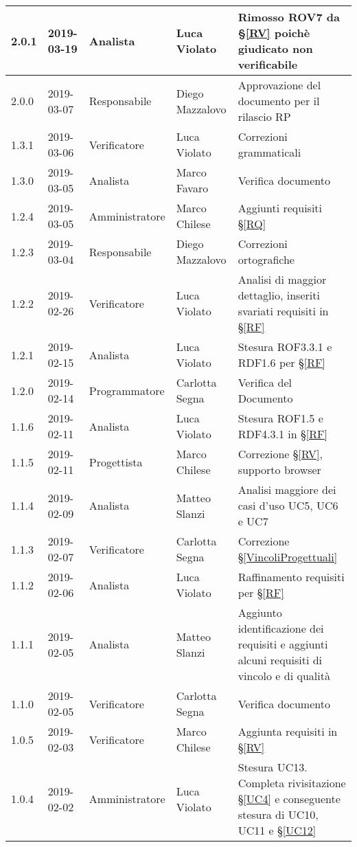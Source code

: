 \begin{center}
\begin{longtable}[C]{|m{}|m{}|m{}|m{}|p{}|}
\hline
\rowcolor{grigio}2.0.1 & 2019-03-19 & Analista & Luca Violato & Rimosso ROV7 da §\ref{RV} poichè giudicato non verificabile\\
\hline
2.0.0 & 2019-03-07 & Responsabile & Diego Mazzalovo & Approvazione del documento per il rilascio RP\\
\hline
\rowcolor{grigio}1.3.1 & 2019-03-06 & Verificatore & Luca Violato & Correzioni grammaticali\\
\hline
1.3.0 & 2019-03-05 & Analista & Marco Favaro & Verifica documento\\
\hline
\rowcolor{grigio}1.2.4 & 2019-03-05 & Amministratore & Marco Chilese & Aggiunti requisiti §\ref{RQ}\\
\hline
1.2.3 & 2019-03-04 & Responsabile & Diego Mazzalovo & Correzioni ortografiche\\
\hline
\rowcolor{grigio}1.2.2 & 2019-02-26 & Verificatore & Luca Violato & Analisi di maggior dettaglio, inseriti svariati requisiti in §\ref{RF}\\
\hline
1.2.1 & 2019-02-15 & Analista & Luca Violato & Stesura ROF3.3.1 e RDF1.6 per §\ref{RF}\\
\hline
\rowcolor{grigio} 1.2.0 & 2019-02-14 & Programmatore & Carlotta Segna & Verifica del Documento\\
\hline
1.1.6 & 2019-02-11 & Analista & Luca Violato & Stesura ROF1.5 e RDF4.3.1 in §\ref{RF}\\
\hline
\rowcolor{grigio}1.1.5 & 2019-02-11 & Progettista & Marco Chilese & Correzione §\ref{RV}, supporto browser\\
\hline
1.1.4 & 2019-02-09 & Analista & Matteo Slanzi & Analisi maggiore dei casi d'uso UC5, UC6 e UC7\\
\hline
\rowcolor{grigio} 1.1.3 & 2019-02-07 & Verificatore & Carlotta Segna & Correzione §\ref{VincoliProgettuali}\\
\hline
1.1.2 & 2019-02-06 & Analista & Luca Violato & Raffinamento requisiti per §\ref{RF}\\
\hline
\rowcolor{grigio}1.1.1 & 2019-02-05 & Analista & Matteo Slanzi & Aggiunto identificazione dei requisiti e  aggiunti alcuni requisiti di vincolo e di qualità \\
\hline
1.1.0 & 2019-02-05 & Verificatore & Carlotta Segna & Verifica documento \\
\hline
\rowcolor{grigio}1.0.5 & 2019-02-03 & Verificatore & Marco Chilese & Aggiunta requisiti in §\ref{RV}\\
\hline
1.0.4 & 2019-02-02 & Amministratore & Luca Violato & Stesura UC13. Completa rivisitazione §\ref{UC4} e conseguente stesura di UC10, UC11 e §\ref{UC12}\\

\end{longtable}
\end{center}
